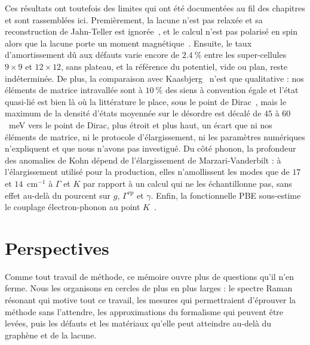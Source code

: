 Ces résultats ont toutefois des limites qui ont été documentées au fil des chapitres et sont rassemblées ici. Premièrement, la lacune n'est pas relaxée et sa reconstruction de Jahn-Teller est ignorée~\cite{el-barbaryStructureEnergeticsVacancy2003}, et le calcul n'est pas polarisé en spin alors que la lacune porte un moment magnétique~\cite{yazyevDefectinducedMagnetismGraphene2007}. Ensuite, le taux d'amortissement dû aux défauts varie encore de $2.4~\%$ entre les super-cellules $9\times 9$ et $12\times 12$, sans plateau, et la référence du potentiel, vide ou plan, reste indéterminée. De plus, la comparaison avec Kaasbjerg~\cite{kaasbjergAtomisticMatrixTheory2020} n'est que qualitative : nos éléments de matrice intravallée sont à $10~\%$ des siens à convention égale et l'état quasi-lié est bien là où la littérature le place, sous le point de Dirac~\cite{kaasbjergAtomisticMatrixTheory2020,pereiraDisorderInducedLocalized2006}, mais le maximum de la densité d'états moyennée sur le désordre est décalé de $45$ à $60$~meV vers le point de Dirac, plus étroit et plus haut, un écart que ni nos éléments de matrice, ni le protocole d'élargissement, ni les paramètres numériques n'expliquent et que nous n'avons pas investigué. Du côté phonon, la profondeur des anomalies de Kohn dépend de l'élargissement de Marzari-Vanderbilt : à l'élargissement utilisé pour la production, elles n'amollissent les modes que de $17$ et $14$~cm$^{-1}$ à $\Gamma$ et $K$ par rapport à un calcul qui ne les échantillonne pas, sans effet au-delà du pourcent sur $g$, $\Gamma^\text{ep}$ et $\gamma$. Enfin, la fonctionnelle PBE sous-estime le couplage électron-phonon au point $K$~\cite{lazzeriImpactElectronelectronCorrelation2008}.

\section{Perspectives}

Comme tout travail de méthode, ce mémoire ouvre plus de questions qu'il n'en ferme. Nous les organisons en cercles de plus en plus larges : le spectre Raman résonant qui motive tout ce travail, les mesures qui permettraient d'éprouver la méthode sans l'attendre, les approximations du formalisme qui peuvent être levées, puis les défauts et les matériaux qu'elle peut atteindre au-delà du graphène et de la lacune.

\bigskip
{}


